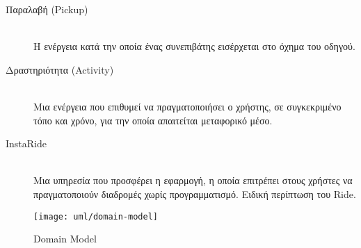\begin{description}
    \item[Παραλαβή (Pickup)] \hfill \\
        Η ενέργεια κατά την οποία ένας συνεπιβάτης εισέρχεται στο όχημα του οδηγού.

    \item[Δραστηριότητα (Activity)] \hfill \\
        Μια ενέργεια που επιθυμεί να πραγματοποιήσει ο χρήστης, σε συγκεκριμένο τόπο και χρόνο, για
        την οποία απαιτείται μεταφορικό μέσο.

    \item[InstaRide] \hfill \\
        Μια υπηρεσία που προσφέρει η εφαρμογή, η οποία επιτρέπει στους χρήστες να
        πραγματοποιούν διαδρομές χωρίς προγραμματισμό. Ειδική περίπτωση του Ride.
\end{description}

\begin{figure}
    \centering
    \texttt{[image: uml/domain-model]}
    \caption{Domain Model}
\end{figure}


